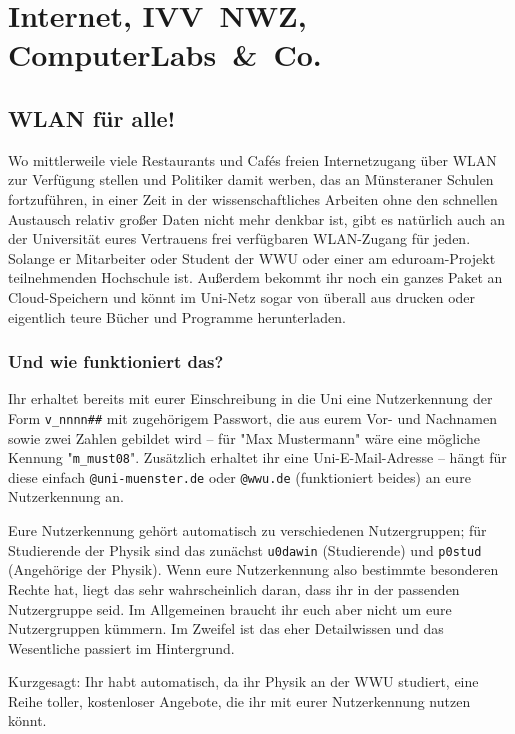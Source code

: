 \section{Internet, IVV~NWZ, Computer\-Labs~\&~Co.}
\begin{multicols*}{2}
\subsection{WLAN für alle!}
Wo mittlerweile viele Restaurants und Cafés freien Internetzugang über WLAN zur Verfügung stellen und Politiker damit werben, das an Münsteraner Schulen fortzuführen, in einer Zeit in der wissenschaftliches Arbeiten ohne den schnellen Austausch relativ großer Daten nicht mehr denkbar ist, gibt es natürlich auch an der Universität eures Vertrauens frei verfügbaren WLAN-Zugang für jeden. Solange er Mitarbeiter oder Student der WWU oder einer am eduroam-Projekt teilnehmenden Hochschule ist.
Außerdem bekommt ihr noch ein ganzes Paket an Cloud-Speichern und könnt im Uni-Netz sogar von überall aus drucken oder eigentlich teure Bücher und Programme herunterladen.

\subsubsection{Und wie funktioniert das?}
Ihr erhaltet bereits mit eurer Einschreibung in die Uni eine Nutzerkennung der Form \texttt{v\_nnnn\#\#} mit zugehörigem Passwort, die aus eurem Vor- und Nachnamen sowie zwei Zahlen gebildet wird -- für "Max Mustermann" wäre eine mögliche Kennung "\texttt{m\_must08}".
Zusätzlich erhaltet ihr eine Uni-E-Mail-Adresse -- hängt für diese einfach \texttt{@uni-muenster.de} oder \texttt{@wwu.de} (funktioniert beides) an eure Nutzerkennung an.

Eure Nutzerkennung gehört automatisch zu verschiedenen Nutzergruppen; für Studierende der Physik sind das zunächst \texttt{u0dawin} (Studierende) und \texttt{p0stud} (Angehörige der Physik).
Wenn eure Nutzerkennung also bestimmte besonderen Rechte hat, liegt das sehr wahrscheinlich daran, dass ihr in der passenden Nutzergruppe seid. Im Allgemeinen braucht ihr euch aber nicht um eure Nutzergruppen kümmern. Im Zweifel ist das eher Detailwissen und das Wesentliche passiert im Hintergrund.

Kurzgesagt: Ihr habt automatisch, da ihr Physik an der WWU studiert, eine Reihe toller, kostenloser Angebote, die ihr mit eurer Nutzerkennung nutzen könnt.


\end{multicols*}
